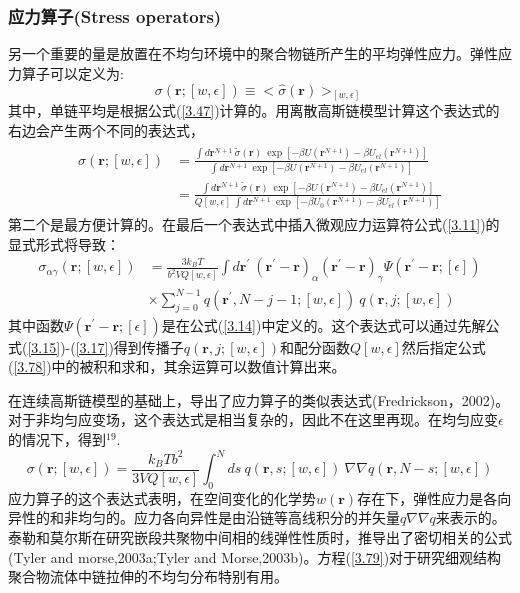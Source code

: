 \subsubsection{应力算子(Stress operators)}
另一个重要的量是放置在不均匀环境中的聚合物链所产生的平均弹性应力。弹性应力算子可以定义为:
\begin{equation}\label{3.71}
\sigma(\mathbf{\mathbf{r}};[w,\epsilon])\equiv<\hat{\sigma}(\mathbf{r})>_{[w,\epsilon]}
\end{equation}
其中，单链平均是根据公式(\ref{3.47})计算的。用离散高斯链模型计算这个表达式的右边会产生两个不同的表达式，
\begin{align}\label{3.77}
\begin{split}
\sigma(\mathbf{r};[w,\epsilon])&=\frac{\int d\mathbf{r}^{N+1}~{\tilde{\sigma}}(\mathbf{r})~\exp[-\beta U(\mathbf{r}^{N+1})-\beta U_{el}(\mathbf{r}^{N+1})]}{\int d\mathbf{r}^{N+1}~\exp[-\beta U(\mathbf{r}^{N+1})-\beta U_{el}(\mathbf{r}^{N+1})]}\\&=\frac{\int d\mathbf{r}^{N+1}~\tilde{\sigma}(\mathbf{r})~\exp[-\beta U(\mathbf{r}^{N+1})-\beta U_{el}(\mathbf{r}^{N+1})]}{Q[w,\epsilon]~\int d\mathbf{r}^{N+1}~\exp[-\beta U_0(\mathbf{r}^{N+1})-\beta U_{el}(\mathbf{r}^{N+1})]}
\end{split}
\end{align}
第二个是最方便计算的。在最后一个表达式中插入微观应力运算符公式(\ref{3.11})的显式形式将导致：
\begin{equation}
\begin{aligned}\label{3.78}
\sigma_{\alpha \gamma}(\mathbf{r};[w,\epsilon])&=\frac{3k_BT}{b^2VQ[w,\epsilon]} \int d\mathbf{r}^{'}~(\mathbf{r}^{'}-\mathbf{r})_{\alpha} (\mathbf{r}^{'}-\mathbf{r})_{\gamma} \varPsi (\mathbf{r}^{'}-\mathbf{r};[\epsilon])\\&\times \sum_{j=0}^{N-1}q(\mathbf{r}^{'},N-j-1;[w,\epsilon])~q(\mathbf{r},j;[w,\epsilon])
\end{aligned}
\end{equation}
其中函数$\varPsi (\mathbf{r}^{'}-\mathbf{r};[\epsilon])$是在公式(\ref{3.14})中定义的。这个表达式可以通过先解公式(\ref{3.15})-(\ref{3.17})得到传播子$q(\mathbf{r},j;[w,\epsilon])$和配分函数$Q[w,\epsilon]$然后指定公式(\ref{3.78})中的被积和求和，其余运算可以数值计算出来。

在连续高斯链模型的基础上，导出了应力算子的类似表达式(Fredrickson，2002)。对于非均匀应变场，这个表达式是相当复杂的，因此不在这里再现。在均匀应变$\epsilon$的情况下，得到$^{19}$.
\begin{equation}\label{3.79}
\sigma(\mathbf{r};[w,\epsilon])=\frac{k_BTb^2}{3VQ[w,\epsilon]}\int_{0}^{N} ds~q(\mathbf{r},s;[w,\epsilon])~\nabla \nabla q(\mathbf{r},N-s;[w,\epsilon])
\end{equation}
应力算子的这个表达式表明，在空间变化的化学势$w(\mathbf{r})$存在下，弹性应力是各向异性的和非均匀的。应力各向异性是由沿链等高线积分的并矢量$q\nabla \nabla q$来表示的。泰勒和莫尔斯在研究嵌段共聚物中间相的线弹性性质时，推导出了密切相关的公式(Tyler and morse,2003a;Tyler and Morse,2003b)。方程(\ref{3.79})对于研究细观结构聚合物流体中链拉伸的不均匀分布特别有用。
